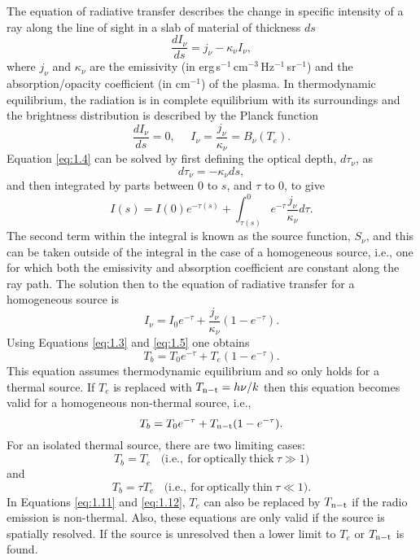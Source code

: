 The equation of radiative transfer describes the change in specific intensity of a ray along the line of sight in a slab of material of thickness $ds$
\begin{equation}\label{eq:1.4}
\frac{dI_{\nu}}{ds}=j_{\nu} - \kappa _{\nu}I_{\nu},
\end{equation}
where $j_{\nu}$ and $\kappa _{\nu}$ are the emissivity (in erg\,s$^{-1}$\,cm$^{-3}$\,Hz$^{-1}$\,sr$^{-1}$) and the absorption/opacity coefficient (in cm$^{-1}$) of the plasma. In thermodynamic equilibrium, the radiation is in complete equilibrium with its surroundings and the brightness distribution is described by the Planck function
\begin{equation}\label{eq:1.5}
\dfrac{dI_{\nu}}{ds}=0, \ \ \ \ \ \ I_{\nu}= \frac{j_{\nu}}{\kappa _{\nu}}=B_{\nu}(T_e).
\end{equation}
Equation \ref{eq:1.4} can be solved by first defining the optical depth, $d\tau _{\nu}$, as
\begin{equation}
d\tau _{\nu}=-\kappa _{\nu}ds,
\end{equation}
and then integrated by parts between 0 to $s$, and $\tau$ to 0, to give 
\begin{equation}
I(s) = I(0)e^{-\tau(s)} + \int ^0 _{\tau (s)}e^{-\tau} \frac{j_{\nu}}{\kappa _{\nu}}d\tau.
\end{equation}
The second term within the integral is known as the source function, $S_{\nu}$, and this can be taken outside of the integral in the case of a homogeneous source, i.e., one for which both the emissivity and absorption coefficient are constant along the ray path. The solution then to the equation of radiative transfer for a homogeneous source is
\begin{equation}\label{eq:1.9}
I_{\nu} = I_{0}e^{-\tau} + \frac{j_{\nu}}{\kappa _{\nu}}(1 - e^{-\tau}).
\end{equation}
Using Equations \ref{eq:1.3} and \ref{eq:1.5} one obtains
\begin{equation}
T_{b} = T_{0}e^{-\tau} + T_{e}(1 - e^{-\tau}).
\end{equation}
This equation assumes thermodynamic equilibrium and so only holds for a thermal source. If $T_{e}$ is replaced with $T_{\rm{n-t}} = h\nu/k$  then this equation becomes valid for a homogeneous non-thermal source, i.e.,
\begin{equation}
T_{b} = T_{0}e^{-\tau} + T_{\rm{n-t}}(1 - e^{-\tau}).
\end{equation}
For an isolated thermal source, there are two limiting cases:
\begin{equation}\label{eq:1.11}
T_{b} = T_{e} \ \ \ \ \mathrm{(i.e.,\ for\ optically\ thick}\ \tau \gg 1)
\end{equation}
and
\begin{equation}\label{eq:1.12}
T_{b} = \tau T_{e} \ \ \ \ \mathrm{(i.e.,\ for\ optically\ thin}\ \tau \ll 1).
\end{equation}
In Equations \ref{eq:1.11} and \ref{eq:1.12}, $T_{e}$ can also be replaced by $T_{\rm{n-t}}$ if the radio emission is non-thermal. Also, these equations are only valid if the source is spatially resolved. If the source is unresolved then a lower limit to $T_{e}$ or $T_{\rm{n-t}}$ is found.

